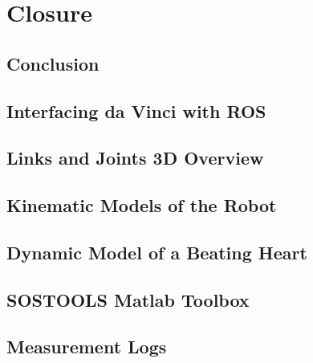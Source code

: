\part{Closure}
\chapter{Conclusion}\label{chap:conclusion}


\label{totalpage}

\begingroup
\raggedright
\clearpage
{}

\endgroup
\label{sourceliste}

\newpage


\begin{appendices}
\appendix
\renewcommand{\appendixname}{Appendix}
\renewcommand{\appendixtocname}{Appendix}

\label{appendixbegin}

\chapter{Interfacing da Vinci with ROS}\label{app:ros}


\chapter{Links and Joints 3D Overview}\label{app:links_joints_3d}


\chapter{Kinematic Models of the Robot}\label{app:kinematic_model_robot}


\chapter{Dynamic Model of a Beating Heart}\label{app:dynamic_model_heart}


\chapter{SOSTOOLS Matlab Toolbox}\label{app:sostools}


\chapter{Measurement Logs}\label{app:meas}



\end{appendices}
